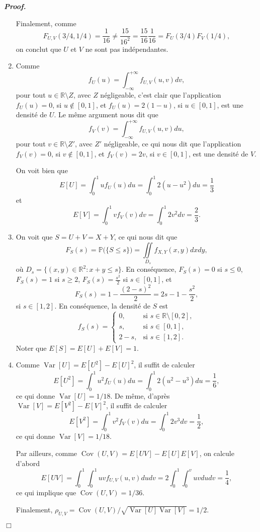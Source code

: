 \documentclass[11pt,a4paper]{article}
\newcommand{\RR}{\mathbb{R}}
\newenvironment{preuve}[1][]
{\vskip 2mm  \noindent\emph{\bf Proof#1. }}{$\Box$ \vskip 2mm}
\let\geq\geqslant
\let\leq\leqslant
\begin{document}
\begin{preuve}
\begin{enumerate}
				Finalement, comme 
				\[     F_{U,V}(3/4,1/4) = \frac{1}{16} \neq \frac{15}{16^{2}} = \frac{15}{16} \frac{1}{16} = F_{U}(3/4) F_{V}(1/4),     \] 
				on conclut que $U$ et $V$ ne sont pas indépendantes. 
				
				\item Comme
				\[     f_U(u) = \int_{- \infty}^{+ \infty} f_{U,V}(u,v) dv,     \]
				pour tout $u \in \RR \setminus Z$, avec $Z$ négligeable, 
				c'est clair que l'application $f_{U}(u) = 0$, si $u \notin [0,1]$, et $f_{U}(u) = 2(1-u)$, si $u \in [0,1]$, est une densité de $U$. 
				Le même argument nous dit que 
				\[     f_V(v) = \int_{- \infty}^{+ \infty} f_{U,V}(u,v) du,     \]
				pour tout $v \in \RR \setminus Z'$, avec $Z'$ négligeable, 
				ce qui nous dit que l'application $f_{V}(v) = 0$, si $v \notin [0,1]$, et $f_{V}(v) = 2v$, si $v \in [0,1]$, est une densité de $V$.
				
				On voit bien que 
				\[     E[U] = \int_{0}^{1} u f_{U}(u) du = \int_{0}^{1} 2(u- u^{2}) du = \frac{1}{3}     \]
				et 
				\[     E[V] = \int_{0}^{1} v f_{V}(v) dv = \int_{0}^{1} 2v^{2} dv = \frac{2}{3}.     \]
				
				\item On voit que $S = U + V = X + Y$, ce qui nous dit que 
				\[     F_{S}(s) = \mathbb{P}\big(\{ S \leq s \}\big) = \underset{D_{s}}{\iint} f_{X,Y}(x,y) dx dy,     \]
				où $D_{s} = \{ (x,y) \in \RR^{2} : x + y \leq s \}$. 
				En conséquence, $F_{S}(s) = 0$ si $s \leq 0$, $F_{S}(s) = 1$ si $s \geq 2$, $F_{S}(s) = \frac{s^{2}}{2}$ si $s \in [0,1]$, et 
				\[     F_{S}(s) = 1 - \frac{(2-s)^{2}}{2} = 2 s - 1 - \frac{s^{2}}{2},     \]
				si $s \in [1,2]$.
				En conséquence, la densité de $S$ est 
				\[     f_{S}(s) = \begin{cases}
				0, &\text{si $s \in \RR \setminus [0,2]$},
				\\
				s, &\text{si $s \in [0,1]$},
				\\
				2-s, &\text{si $s \in [1,2]$}. 
				\end{cases}
				\]     
				Noter que $E[S] = E[U] + E[V] = 1$. 
				
				\item Comme $\operatorname{Var}[U] = E[U^{2}] - E[U]^{2}$, il suffit de calculer 
				\[     E[U^{2}] = \int_{0}^{1} u^{2} f_{U}(u) du = \int_{0}^{1} 2(u^{2}- u^{3}) du = \frac{1}{6},     \] 
				ce qui donne $\operatorname{Var}[U] = 1/18$. 
				De même, d'après $\operatorname{Var}[V] = E[V^{2}] - E[V]^{2}$, il suffit de calculer 
				\[     E[V^{2}] = \int_{0}^{1} v^{2} f_{V}(v) du = \int_{0}^{1} 2v^{3} dv = \frac{1}{2},     \] 
				ce qui donne $\operatorname{Var}[V] = 1/18$. 
				
				Par ailleurs, comme $\operatorname{Cov}(U,V) = E[U V] - E[U] E[V]$, on calcule d'abord 
				\[     E[U V] = \int_{0}^{1} \int_{0}^{1} u v f_{U,V}(u,v) du dv = 2 \int_{0}^{1} \int_{0}^{v} u v du dv = \frac{1}{4},     \] 
				ce qui implique que $\operatorname{Cov}(U,V) = 1/36$.
				
				Finalement, $\rho_{U,V} = \operatorname{Cov}(U,V)/\sqrt{\operatorname{Var}[U] \operatorname{Var}[V]} = 1/2$. 
			\end{enumerate}
		\end{preuve}
		
\end{document}
